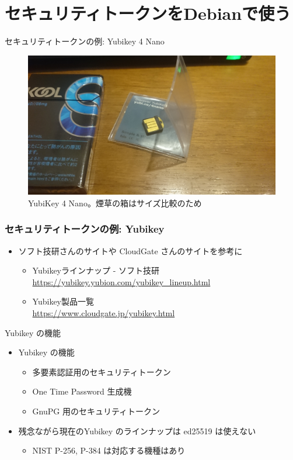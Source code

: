 \documentclass[cjk,c,squeeze,shrink,dvipdfmx,11pt,%
hyperref={bookmarks=true,bookmarksnumbered=true,bookmarksopen=false,%
colorlinks=false,%
pdftitle={},%
pdfauthor={}%
pdfinstitute={関西 Debian 勉強会},%
pdfsubject={},%
}]{beamer}
\begin{document}
\section{セキュリティトークンをDebianで使う}
\begin{frame}{セキュリティトークンの例: Yubikey 4 Nano}
  \begin{figure}[htbp!]
    \centering
    \includegraphics[width=.8\linewidth]{image201705/Yubikey4Nano.jpg}
    \caption{YubiKey 4 Nano。煙草の箱はサイズ比較のため}
    \label{figure:YubiKey 4 Nano。煙草の箱はサイズ比較のため}
  \end{figure}
\end{frame}
\begin{frame}
  \frametitle{セキュリティトークンの例: Yubikey}
  \begin{itemize}
  \item %
    ソフト技研さんのサイトや CloudGate さんのサイトを参考に
    \begin{itemize}
    \item %
      Yubikeyラインナップ - ソフト技研\\
      \url{https://yubikey.yubion.com/yubikey_lineup.html}
    \item %
      Yubikey製品一覧 \\
      \url{https://www.cloudgate.jp/yubikey.html}
    \end{itemize}
  \end{itemize}
\end{frame}
\begin{frame}{Yubikey の機能}
  \begin{itemize}
  \item %
    Yubikey の機能
    \begin{itemize}
    \item %
      多要素認証用のセキュリティトークン
    \item %
      One Time Password 生成機
    \item%
      GnuPG 用のセキュリティトークン
    \end{itemize}
  \item %
    残念ながら現在のYubikey のラインナップは ed25519 は使えない
    \begin{itemize}
    \item %
      NIST P-256, P-384 は対応する機種はあり
    \end{itemize}
  \end{itemize}
\end{frame}
\end{document}
